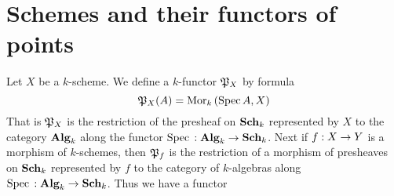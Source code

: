 \section{Schemes and their functors of points}
\noindent
Let $X$ be a $k$-scheme. We define a $k$-functor ${\mathfrak P}_X$ by formula
$${\mathfrak P}_X(A) = \mathrm{Mor}_k\left(\mathrm{Spec}\, A,X\right)$$
That is ${\mathfrak P}_X$ is the restriction of the presheaf on $\mathbf{Sch}_k$ represented by $X$ to the category $\mathbf{Alg}_k$ along the functor $\mathrm{Spec}\,:\mathbf{Alg}_k\rightarrow \mathbf{Sch}_k$. Next if $f:X\rightarrow Y$ is a morphism of $k$-schemes, then ${\mathfrak P}_f$ is the restriction of a morphism of presheaves on $\mathbf{Sch}_k$ represented by $f$ to the category of $k$-algebras along $\mathrm{Spec}\,:\mathbf{Alg}_k\rightarrow \mathbf{Sch}_k$. Thus we have a functor
\begin{center}
\end{center}

